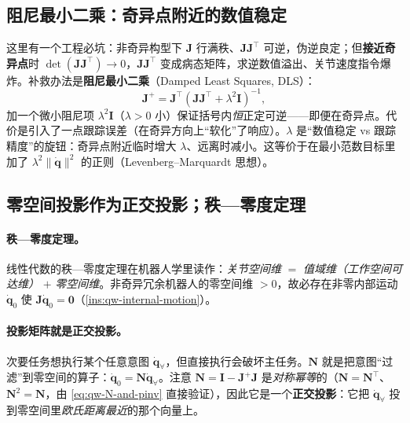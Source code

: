 \subsection{阻尼最小二乘：奇异点附近的数值稳定}
\label{subsec:qw-dls}

\begin{insight}\label{ins:qw-dls}
这里有一个工程必坑：非奇异构型下 $\boldsymbol{J}$ 行满秩、$\boldsymbol{J}\boldsymbol{J}^\top$ 可逆，伪逆良定；但\textbf{接近奇异点}时 $\det(\boldsymbol{J}\boldsymbol{J}^\top)\to0$，$\boldsymbol{J}\boldsymbol{J}^\top$ 变成病态矩阵，求逆数值溢出、关节速度指令爆炸。补救办法是\textbf{阻尼最小二乘}（Damped Least Squares, DLS）：
\begin{equation}
  \boldsymbol{J}^+=\boldsymbol{J}^\top(\boldsymbol{J}\boldsymbol{J}^\top+\lambda^2\mathbf{I})^{-1},
  \label{eq:qw-dls}
\end{equation}
加一个微小阻尼项 $\lambda^2\mathbf{I}$（$\lambda>0$ 小）保证括号内\emph{恒}正定可逆——即便在奇异点。代价是引入了一点跟踪误差（在奇异方向上“软化”了响应）。$\lambda$ 是“数值稳定 vs 跟踪精度”的旋钮：奇异点附近临时增大 $\lambda$、远离时减小。这等价于在最小范数目标里加了 $\lambda^2\|\dot{\boldsymbol{q}}\|^2$ 的正则（Levenberg--Marquardt 思想）。
\end{insight}

\subsection{零空间投影作为正交投影；秩—零度定理}
\label{subsec:qw-ortho-proj}

\paragraph{秩—零度定理。}
线性代数的秩—零度定理在机器人学里读作：\emph{关节空间维} $=$ \emph{值域维（工作空间可达维）} $+$ \emph{零空间维}。非奇异冗余机器人的零空间维 $>0$，故必存在非零内部运动 $\dot{\boldsymbol{q}}_0$ 使 $\boldsymbol{J}\dot{\boldsymbol{q}}_0=\mathbf{0}$（\cref{ins:qw-internal-motion}）。

\paragraph{投影矩阵就是正交投影。}
次要任务想执行某个任意意图 $\dot{\boldsymbol{q}}_{\forall}$，但直接执行会破坏主任务。$\boldsymbol{N}$ 就是把意图“过滤”到零空间的算子：$\dot{\boldsymbol{q}}_0=\boldsymbol{N}\dot{\boldsymbol{q}}_{\forall}$。注意 $\boldsymbol{N}=\mathbf{I}-\boldsymbol{J}^+\boldsymbol{J}$ 是\emph{对称幂等}的（$\boldsymbol{N}=\boldsymbol{N}^\top$、$\boldsymbol{N}^2=\boldsymbol{N}$，由 \cref{eq:qw-N-and-pinv} 直接验证），因此它是一个\textbf{正交投影}：它把 $\dot{\boldsymbol{q}}_{\forall}$ 投到零空间里\emph{欧氏距离最近}的那个向量上。

